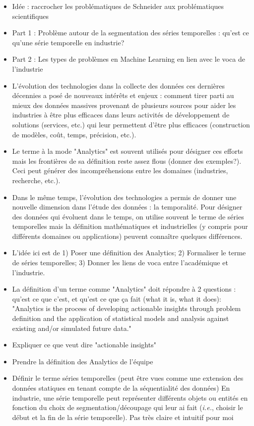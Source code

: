\begin{itemize}
	\item Idée : raccrocher les problématiques de Schneider aux problématiques scientifiques
	\item Part 1 : Problème autour de la segmentation des séries temporelles : qu'est ce qu'une série temporelle en industrie?
	\item Part 2 : Les types de problèmes en Machine Learning en lien avec le voca de l'industrie
	\item L'évolution des technologies dans la collecte des données ces dernières décennies a posé de nouveaux intérêts et enjeux : comment tirer parti au mieux des données massives provenant de plusieurs sources pour aider les industries à être plus efficaces dans leurs activités de développement de solutions (services, etc.) qui leur permettent d'être plus efficaces (construction de modèles, coût, temps, précision, etc.).
	\item Le terme à la mode "Analytics" est souvent utilisés pour désigner ces efforts mais les frontières de sa définition reste assez flous (donner des exemples?). Ceci peut générer des incompréhensions entre les domaines (industries, recherche, etc.).
	\item Dans le même temps, l'évolution des technologies a permis de donner une nouvelle dimension dans l'étude des données : la temporalité. Pour désigner des données qui évoluent dans le temps, on utilise souvent le terme de séries temporelles mais la définition mathématiques et industrielles (y compris pour différents domaines ou applications) peuvent connaître quelques différences.
	\item L'idée ici est de 1) Poser une définition des Analytics; 2) Formaliser le terme de séries temporelles; 3) Donner les liens de voca entre l'académique et l'industrie. 
	\item La définition d'un terme comme "Analytics" doit répondre à 2 questions : qu'est ce que c'est, et qu'est ce que ça fait (what it is, what it does): "Analytics is the process of developing actionable insights through problem definition and the application of statistical models and analysis against existing and/or simulated future data."
	\item Expliquer ce que veut dire "actionable insights"
	\item Prendre la définition des Analytics de l'équipe
	\item Définir le terme séries temporelles (peut être vues comme une extension des données statiques en tenant compte de la séquentialité des données) En industrie, une série temporelle peut représenter différents objets ou entités en fonction du choix de segmentation/découpage qui leur ai fait (\textit{i.e.}, choisir le début et la fin de la série temporelle). Pas très claire et intuitif pour moi

\end{itemize}
